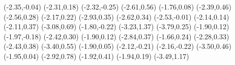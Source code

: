 \psdot[](-2.35,-0.04)
\psdot[](-2.31,0.18)
\psdot[](-2.32,-0.25)
\psdot[](-2.61,0.56)
\psdot[](-1.76,0.08)
\psdot[](-2.39,0.46)
\psdot[](-2.56,0.28)
\psdot[](-2.17,0.22)
\psdot[](-2.93,0.35)
\psdot[](-2.62,0.34)
\psdot[](-2.53,-0.01)
\psdot[](-2.14,0.14)
\psdot[](-2.11,0.37)
\psdot[](-3.08,0.69)
\psdot[](-1.80,-0.22)
\psdot[](-3.23,1.37)
\psdot[](-3.79,0.25)
\psdot[](-1.90,0.12)
\psdot[](-1.97,-0.18)
\psdot[](-2.42,0.30)
\psdot[](-1.90,0.12)
\psdot[](-2.84,0.37)
\psdot[](-1.66,0.24)
\psdot[](-2.28,0.33)
\psdot[](-2.43,0.38)
\psdot[](-3.40,0.55)
\psdot[](-1.90,0.05)
\psdot[](-2.12,-0.21)
\psdot[](-2.16,-0.22)
\psdot[](-3.50,0.46)
\psdot[](-1.95,0.04)
\psdot[](-2.92,0.78)
\psdot[](-1.92,0.41)
\psdot[](-1.94,0.19)
\psdot[](-3.49,1.17)
